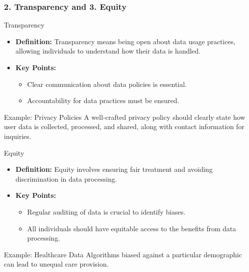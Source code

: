 \documentclass[aspectratio=169]{beamer}
\begin{document}
\begin{frame}[fragile]
    \frametitle{2. Transparency and 3. Equity}
    \begin{block}{Transparency}
        \begin{itemize}
            \item \textbf{Definition:} Transparency means being open about data usage practices, allowing individuals to understand how their data is handled.
            \item \textbf{Key Points:} 
            \begin{itemize}
                \item Clear communication about data policies is essential.
                \item Accountability for data practices must be ensured.
            \end{itemize}
        \end{itemize}
    \end{block}

    \begin{block}{Example: Privacy Policies}
        A well-crafted privacy policy should clearly state how user data is collected, processed, and shared, along with contact information for inquiries.
    \end{block}

    \begin{block}{Equity}
        \begin{itemize}
            \item \textbf{Definition:} Equity involves ensuring fair treatment and avoiding discrimination in data processing.
            \item \textbf{Key Points:} 
            \begin{itemize}
                \item Regular auditing of data is crucial to identify biases.
                \item All individuals should have equitable access to the benefits from data processing.
            \end{itemize}
        \end{itemize}
    \end{block}

    \begin{block}{Example: Healthcare Data}
        Algorithms biased against a particular demographic can lead to unequal care provision.
    \end{block}
\end{frame}
\end{document}
